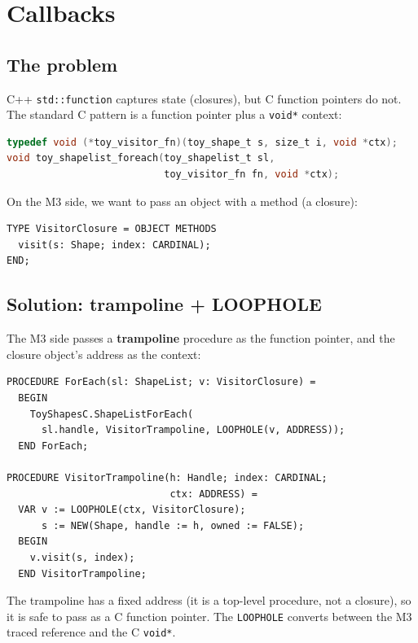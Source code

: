 \documentclass[11pt]{article}
\begin{document}
\section{Callbacks}

\subsection{The problem}

C++ \texttt{std::function} captures state (closures), but C function
pointers do not.  The standard C pattern is a function pointer plus a
\texttt{void*} context:

\begin{lstlisting}[language=C]
typedef void (*toy_visitor_fn)(toy_shape_t s, size_t i, void *ctx);
void toy_shapelist_foreach(toy_shapelist_t sl,
                           toy_visitor_fn fn, void *ctx);
\end{lstlisting}

On the M3 side, we want to pass an object with a method (a closure):

\begin{lstlisting}
TYPE VisitorClosure = OBJECT METHODS
  visit(s: Shape; index: CARDINAL);
END;
\end{lstlisting}

\subsection{Solution: trampoline + LOOPHOLE}

The M3 side passes a \textbf{trampoline} procedure as the function
pointer, and the closure object's address as the context:

\begin{lstlisting}
PROCEDURE ForEach(sl: ShapeList; v: VisitorClosure) =
  BEGIN
    ToyShapesC.ShapeListForEach(
      sl.handle, VisitorTrampoline, LOOPHOLE(v, ADDRESS));
  END ForEach;

PROCEDURE VisitorTrampoline(h: Handle; index: CARDINAL;
                            ctx: ADDRESS) =
  VAR v := LOOPHOLE(ctx, VisitorClosure);
      s := NEW(Shape, handle := h, owned := FALSE);
  BEGIN
    v.visit(s, index);
  END VisitorTrampoline;
\end{lstlisting}

The trampoline has a fixed address (it is a top-level procedure,
not a closure), so it is safe to pass as a C function pointer.
The \texttt{LOOPHOLE} converts between the M3 traced reference
and the C \texttt{void*}.
\end{document}
